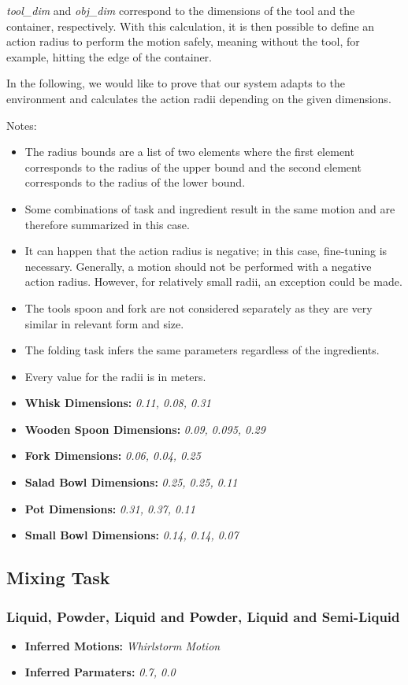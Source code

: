 \textit{tool\_dim} and \textit{obj\_dim} correspond to the dimensions of the tool and the container, respectively.
With this calculation, it is then possible to define an action radius to perform the motion safely, meaning without the tool, for example, hitting the edge of the container.

In the following, we would like to prove that our system adapts to the environment and calculates the action radii depending on the given dimensions.

Notes:
\begin{itemize}
    \item The radius bounds are a list of two elements where the first element corresponds to the radius of the upper bound and the second element corresponds to the radius of the lower bound.
    \item Some combinations of task and ingredient result in the same motion and are therefore summarized in this case.
    \item It can happen that the action radius is negative; in this case, fine-tuning is necessary. Generally, a motion should not be performed with a negative action radius. However, for relatively small radii, an exception could be made.
    \item The tools spoon and fork are not considered separately as they are very similar in relevant form and size.
    \item The folding task infers the same parameters regardless of the ingredients.
    \item Every value for the radii is in meters.
    \item \textbf{Whisk Dimensions:} \textit{0.11, 0.08, 0.31}
    \item \textbf{Wooden Spoon Dimensions:} \textit{0.09, 0.095, 0.29}
    \item \textbf{Fork Dimensions:} \textit{0.06, 0.04, 0.25}
    \item \textbf{Salad Bowl Dimensions:} \textit{0.25, 0.25, 0.11}
    \item \textbf{Pot Dimensions:} \textit{0.31, 0.37, 0.11}
    \item \textbf{Small Bowl Dimensions:} \textit{0.14, 0.14, 0.07}
\end{itemize}


\subsection{Mixing Task}
\subsubsection{Liquid, Powder, Liquid and Powder, Liquid and Semi-Liquid}
\begin{itemize}
    \item \textbf{Inferred Motions:} \textit{Whirlstorm Motion}
    \item \textbf{Inferred Parmaters:} \textit{0.7, 0.0}
\end{itemize}


